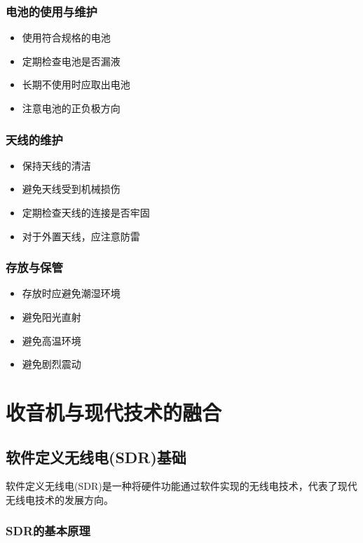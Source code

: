 \documentclass[12pt,UTF8]{ctexbook}
\begin{document}
\section{电池的使用与维护}\begin{itemize}
  \item 使用符合规格的电池
  \item 定期检查电池是否漏液
  \item 长期不使用时应取出电池
  \item 注意电池的正负极方向\end{itemize}

\section{天线的维护}\begin{itemize}
  \item 保持天线的清洁
  \item 避免天线受到机械损伤
  \item 定期检查天线的连接是否牢固
  \item 对于外置天线，应注意防雷\end{itemize}

\section{存放与保管}\begin{itemize}
  \item 存放时应避免潮湿环境
  \item 避免阳光直射
  \item 避免高温环境
  \item 避免剧烈震动\end{itemize}

\part{收音机与现代技术的融合}

\chapter{软件定义无线电(SDR)基础}

软件定义无线电(SDR)是一种将硬件功能通过软件实现的无线电技术，代表了现代无线电技术的发展方向。

\section{SDR的基本原理}
\end{document}
